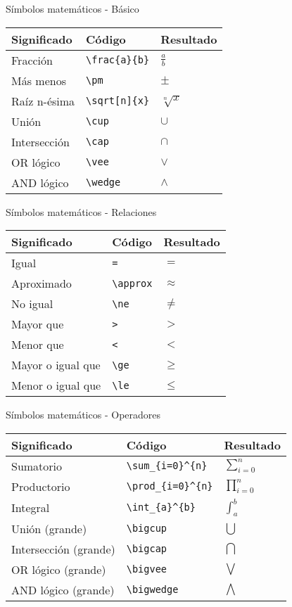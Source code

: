 \documentclass[
  ignorenonframetext,
]{beamer}
\begin{document}
\begin{frame}[fragile]{Símbolos matemáticos - Básico}
\protect\hypertarget{suxedmbolos-matemuxe1ticos---buxe1sico-1}{}

\begin{longtable}[]{@{}lll@{}}
\toprule
Significado & Código & Resultado\tabularnewline
\midrule
\endhead
Fracción & \texttt{\textbackslash{}frac\{a\}\{b\}} &
\(\frac{a}{b}\)\tabularnewline
Más menos & \texttt{\textbackslash{}pm} & \(\pm\)\tabularnewline
Raíz n-ésima & \texttt{\textbackslash{}sqrt{[}n{]}\{x\}} &
\(\sqrt[n]{x}\)\tabularnewline
Unión & \texttt{\textbackslash{}cup} & \(\cup\)\tabularnewline
Intersección & \texttt{\textbackslash{}cap} & \(\cap\)\tabularnewline
OR lógico & \texttt{\textbackslash{}vee} & \(\vee\)\tabularnewline
AND lógico & \texttt{\textbackslash{}wedge} & \(\wedge\)\tabularnewline
\bottomrule
\end{longtable}

\end{frame}

\begin{frame}[fragile]{Símbolos matemáticos - Relaciones}
\protect\hypertarget{suxedmbolos-matemuxe1ticos---relaciones}{}

\begin{longtable}[]{@{}lll@{}}
\toprule
Significado & Código & Resultado\tabularnewline
\midrule
\endhead
Igual & \texttt{=} & \(=\)\tabularnewline
Aproximado & \texttt{\textbackslash{}approx} &
\(\approx\)\tabularnewline
No igual & \texttt{\textbackslash{}ne} & \(\ne\)\tabularnewline
Mayor que & \texttt{\textgreater{}} & \(>\)\tabularnewline
Menor que & \texttt{\textless{}} & \(<\)\tabularnewline
Mayor o igual que & \texttt{\textbackslash{}ge} & \(\ge\)\tabularnewline
Menor o igual que & \texttt{\textbackslash{}le} & \(\le\)\tabularnewline
\bottomrule
\end{longtable}

\end{frame}

\begin{frame}[fragile]{Símbolos matemáticos - Operadores}
\protect\hypertarget{suxedmbolos-matemuxe1ticos---operadores}{}

\begin{longtable}[]{@{}lll@{}}
\toprule
Significado & Código & Resultado\tabularnewline
\midrule
\endhead
Sumatorio & \texttt{\textbackslash{}sum\_\{i=0\}\^{}\{n\}} &
\(\sum_{i=0}^{n}\)\tabularnewline
Productorio & \texttt{\textbackslash{}prod\_\{i=0\}\^{}\{n\}} &
\(\prod_{i=0}^{n}\)\tabularnewline
Integral & \texttt{\textbackslash{}int\_\{a\}\^{}\{b\}} &
\(\int_{a}^{b}\)\tabularnewline
Unión (grande) & \texttt{\textbackslash{}bigcup} &
\(\bigcup\)\tabularnewline
Intersección (grande) & \texttt{\textbackslash{}bigcap} &
\(\bigcap\)\tabularnewline
OR lógico (grande) & \texttt{\textbackslash{}bigvee} &
\(\bigvee\)\tabularnewline
AND lógico (grande) & \texttt{\textbackslash{}bigwedge} &
\(\bigwedge\)\tabularnewline
\bottomrule
\end{longtable}

\end{frame}
\end{document}
